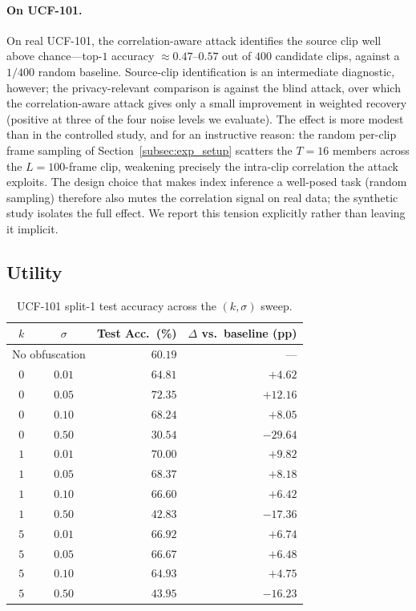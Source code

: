 \documentclass[sigconf,anonymous, review]{acmart}
\begin{document}
\paragraph{On UCF-101.}
On real UCF-101, the correlation-aware attack identifies the source clip well above chance---top-$1$ accuracy $\approx 0.47$--$0.57$ out of $400$ candidate clips, against a $1/400$ random baseline. Source-clip identification is an intermediate diagnostic, however; the privacy-relevant comparison is against the blind attack, over which the correlation-aware attack gives only a small improvement in weighted recovery (positive at three of the four noise levels we evaluate). The effect is more modest than in the controlled study, and for an instructive reason: the random per-clip frame sampling of Section~\ref{subsec:exp_setup} scatters the $T=16$ members across the $L=100$-frame clip, weakening precisely the intra-clip correlation the attack exploits. The design choice that makes index inference a well-posed task (random sampling) therefore also mutes the correlation signal on real data; the synthetic study isolates the full effect. We report this tension explicitly rather than leaving it implicit.

\subsection{Utility}
\label{subsec:utility}

\begin{table}[t]
\centering\small
\caption{UCF-101 split-1 test accuracy across the $(k, \sigma)$ sweep.}
\label{tab:utility}
\begin{tabular}{ccrr}
\toprule
$k$ & $\sigma$ & Test Acc.\ (\%) & $\Delta$ vs.\ baseline (pp) \\
\midrule
\multicolumn{2}{c}{No obfuscation} & $60.19$ & --- \\
\midrule
$0$ & $0.01$ & $64.81$ & $+4.62$  \\
$0$ & $0.05$ & $72.35$ & $+12.16$ \\
$0$ & $0.10$ & $68.24$ & $+8.05$  \\
$0$ & $0.50$ & $30.54$ & $-29.64$ \\
\midrule
$1$ & $0.01$ & $70.00$ & $+9.82$  \\
$1$ & $0.05$ & $68.37$ & $+8.18$  \\
$1$ & $0.10$ & $66.60$ & $+6.42$  \\
$1$ & $0.50$ & $42.83$ & $-17.36$ \\
\midrule
$5$ & $0.01$ & $66.92$ & $+6.74$  \\
$5$ & $0.05$ & $66.67$ & $+6.48$  \\
$5$ & $0.10$ & $64.93$ & $+4.75$  \\
$5$ & $0.50$ & $43.95$ & $-16.23$ \\
\bottomrule
\end{tabular}
\end{table}
\end{document}
